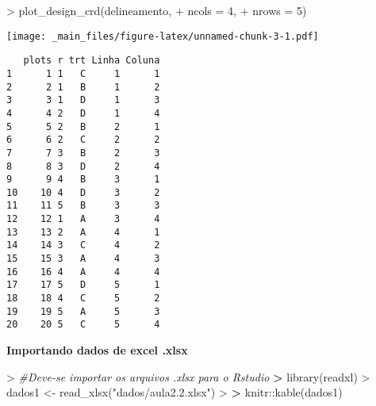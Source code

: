 \documentclass[
]{book}
\newenvironment{Shaded}{\begin{snugshade}}{\end{snugshade}}
\newcommand{\AttributeTok}[1]{\textcolor[rgb]{0.77,0.63,0.00}{#1}}
\newcommand{\CommentTok}[1]{\textcolor[rgb]{0.56,0.35,0.01}{\textit{#1}}}
\newcommand{\DecValTok}[1]{\textcolor[rgb]{0.00,0.00,0.81}{#1}}
\newcommand{\ErrorTok}[1]{\textcolor[rgb]{0.64,0.00,0.00}{\textbf{#1}}}
\newcommand{\FunctionTok}[1]{\textcolor[rgb]{0.00,0.00,0.00}{#1}}
\newcommand{\NormalTok}[1]{#1}
\newcommand{\OtherTok}[1]{\textcolor[rgb]{0.56,0.35,0.01}{#1}}
\newcommand{\SpecialCharTok}[1]{\textcolor[rgb]{0.00,0.00,0.00}{#1}}
\newcommand{\StringTok}[1]{\textcolor[rgb]{0.31,0.60,0.02}{#1}}
\begin{document}
\begin{Shaded}
\begin{Highlighting}[]
\SpecialCharTok{\textgreater{}} \FunctionTok{plot\_design\_crd}\NormalTok{(delineamento,}
\SpecialCharTok{+}                 \AttributeTok{ncols =} \DecValTok{4}\NormalTok{,}
\SpecialCharTok{+}                 \AttributeTok{nrows =} \DecValTok{5}\NormalTok{)}
\end{Highlighting}
\end{Shaded}

\texttt{[image: \_main\_files/figure-latex/unnamed-chunk-3-1.pdf]}

\begin{Shaded}
\end{Shaded}

\begin{verbatim}
   plots r trt Linha Coluna
1      1 1   C     1      1
2      2 1   B     1      2
3      3 1   D     1      3
4      4 2   D     1      4
5      5 2   B     2      1
6      6 2   C     2      2
7      7 3   B     2      3
8      8 3   D     2      4
9      9 4   B     3      1
10    10 4   D     3      2
11    11 5   B     3      3
12    12 1   A     3      4
13    13 2   A     4      1
14    14 3   C     4      2
15    15 3   A     4      3
16    16 4   A     4      4
17    17 5   D     5      1
18    18 4   C     5      2
19    19 5   A     5      3
20    20 5   C     5      4
\end{verbatim}

\textbf{Importando dados de excel .xlsx}

\begin{Shaded}
\begin{Highlighting}[]
\SpecialCharTok{\textgreater{}} \CommentTok{\#Deve{-}se importar os arquivos .xlsx para o Rstudio}
\ErrorTok{\textgreater{}} \FunctionTok{library}\NormalTok{(readxl)}
\SpecialCharTok{\textgreater{}}\NormalTok{ dados1 }\OtherTok{\textless{}{-}} \FunctionTok{read\_xlsx}\NormalTok{(}\StringTok{"dados/aula2.2.xlsx"}\NormalTok{)}
\SpecialCharTok{\textgreater{}} 
\ErrorTok{\textgreater{}}\NormalTok{ knitr}\SpecialCharTok{::}\FunctionTok{kable}\NormalTok{(dados1)}
\end{Highlighting}
\end{Shaded}
\end{document}
